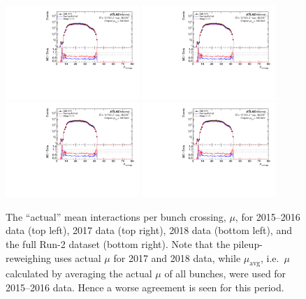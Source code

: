 \begin{figure}[h!]
  \centering
  \includegraphics[page=5,width=0.45\textwidth]{figures/ZjetOmnifoldMCDataComp.pdf}
  \includegraphics[page=6,width=0.45\textwidth]{figures/ZjetOmnifoldMCDataComp.pdf} \\
  \includegraphics[page=7,width=0.45\textwidth]{figures/ZjetOmnifoldMCDataComp.pdf}
  \includegraphics[page=8,width=0.45\textwidth]{figures/ZjetOmnifoldMCDataComp.pdf}
  \caption{The ``actual'' mean interactions per bunch crossing, $\mu$, for 2015--2016 data (top left), 2017 data (top right), 2018 data (bottom left), and the full Run-2 dataset (bottom right). Note that the pileup-reweighing uses actual $\mu$ for 2017 and 2018 data, while $\mu_\mathrm{avg}$, i.e.\ $\mu$ calculated by averaging the actual $\mu$ of all bunches, were used for 2015--2016 data. Hence a worse agreement is seen for this period.}
  \label{fig:MuActual}
\end{figure}

